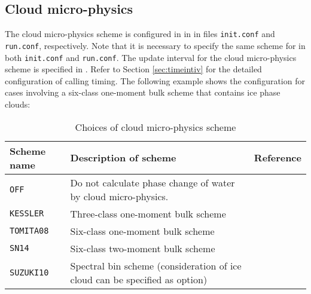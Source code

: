 
\subsection{Cloud micro-physics} \label{subsec:basic_usel_microphys}
The cloud micro-physics scheme is configured in  in  in files \verb|init.conf| and \verb|run.conf|, respectively.
{\color{blue} Note that it is necessary to specify the same scheme for  in both \texttt{init.conf} and \texttt{run.conf}}.
The update interval for the cloud micro-physics scheme is specified in . Refer to Section \ref{sec:timeintiv} for the detailed configuration of calling timing. The following example shows the configuration for cases involving a six-class one-moment bulk scheme that contains ice phase clouds:


\begin{table}[tbh]
\begin{center}
  \caption{Choices of cloud micro-physics scheme}
  \label{tab:nml_atm_mp}
  \begin{tabularx}{150mm}{lXX} \hline
    \rowcolor[gray]{0.9}  Scheme name & Description of scheme & Reference\\ \hline
     \verb|OFF|      & Do not calculate phase change of water by cloud micro-physics. &  \\
     \verb|KESSLER|  & Three-class one-moment bulk scheme & \citet{kessler_1969} \\
     \verb|TOMITA08| & Six-class one-moment bulk scheme & \citet{tomita_2008} \\
     \verb|SN14|     & Six-class two-moment bulk scheme & \citet{sn_2014} \\
     \verb|SUZUKI10| & Spectral bin scheme (consideration of ice cloud can be specified as option) & \citet{suzuki_etal_2010} \\
    \hline
  \end{tabularx}
\end{center}
\end{table}

